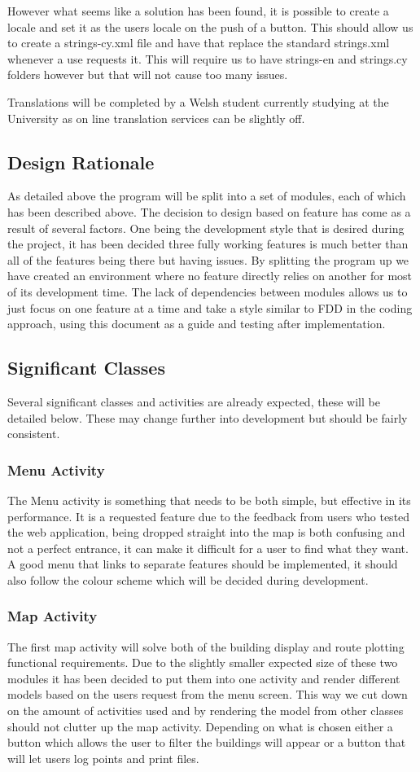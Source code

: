 \documentclass[10pt,a4paper]{article}
\begin{document}
However what seems like a solution has been found, it is possible to create a locale and set it as the users locale on the push of a button. This should allow us to create a strings-cy.xml file and have that replace the standard strings.xml whenever a use requests it. This will require us to have strings-en and strings.cy folders however but that will not cause too many issues.

Translations will be completed by a Welsh student currently studying at the University as on line translation services can be slightly off.
\subsection{Design Rationale}
As detailed above the program will be split into a set of modules, each of which has been described above. The decision to design based on feature has come as a result of several factors. One being the development style that is desired during the project, it has been decided three fully working features is much better than all of the features being there but having issues. By splitting the program up we have created an environment where no feature directly relies on another for most of its development time. The lack of dependencies between modules allows us to just focus on one feature at a time and take a style similar to FDD in the coding approach, using this document as a guide and testing after implementation.

\subsection{Significant Classes}
Several significant classes and activities are already expected, these will be detailed below. These may change further into development but should be fairly consistent.
\subsubsection{Menu Activity}
The Menu activity is something that needs to be both simple, but effective in its performance. It is a requested feature due to the feedback from users who tested the web application, being dropped straight into the map is both confusing and not a perfect entrance, it can make it difficult for a user to find what they want. A good menu that links to separate features should be implemented, it should also follow the colour scheme which will be decided during development.
\subsubsection{Map Activity}
The first map activity will solve both of the building display and route plotting functional requirements. Due to the slightly smaller expected size of these two modules it has been decided to put them into one activity and render different models based on the users request from the menu screen. This way we cut down on the amount of activities used and by rendering the model from other classes should not clutter up the map activity. Depending on what is chosen either a button which allows the user to filter the buildings will appear or a button that will let users log points and print files. 
\end{document}
